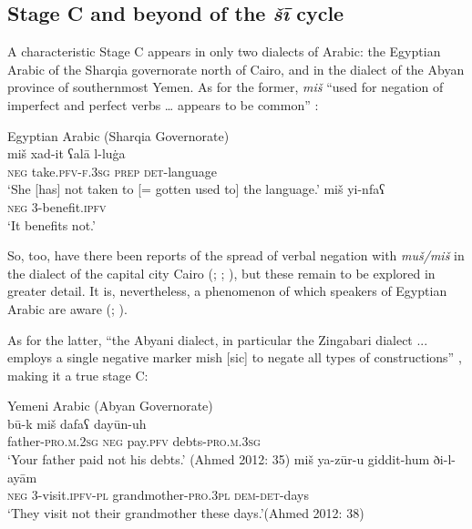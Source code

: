\documentclass[output=paper]{langsci/langscibook}
\begin{document}
\subsection{Stage C and beyond of the \textit{šī} cycle} \label{s:WiAR-3.5}

A characteristic Stage C appears in only two dialects of Arabic: the Egyptian Arabic of the Sharqia governorate north of Cairo, and in the dialect of the Abyan province of southernmost Yemen. As for the former, \textit{miš} “used for negation of imperfect and perfect verbs … appears to be common” \citep[v, 70-72, emphasis added]{h2011a}:

\ea Egyptian Arabic (Sharqia Governorate)\label{ex:WiAR-19}\\
  \ea
  	\gll miš xad-it ʕalā l-luġa\\
  	\textsc{neg} take.\textsc{pfv-f.3sg} \textsc{prep} \textsc{det}-language \\
  	\glt ‘She [has] not taken to [= gotten used to] the language.’ \citep[59]{h2011a}
  \ex
  	\gll miš yi-nfaʕ\\
  	\textsc{neg} 3-benefit.\textsc{ipfv}\\
  	\glt ‘It benefits not.’ \citep[72]{h2011a} 
\z \z

So, too, have there been reports of the spread of verbal negation with \textit{muš/miš} in the dialect of the capital city Cairo (\citealp[301–306]{brustad2000a}; \citealp{doss2008a}; \citealp[525]{wilmsen2020a}), but these remain to be explored in greater detail. It is, nevertheless, a phenomenon of which speakers of Egyptian Arabic are aware (\citealp[301]{brustad2000a}; \citealp[65-72]{h2011a}).

As for the latter, “the Abyani dialect, in particular the Zingabari dialect ... employs a single negative marker mish [sic] to negate all types of constructions”  \citep[33]{ahmed2012}, making it a true stage C:

\ea Yemeni Arabic (Abyan Governorate)\label{ex:WiAR-20}\\
  \ea
  	\gll bū-k miš dafaʕ dayūn-uh\\
  	father-\textsc{pro.m.2sg} \textsc{neg} pay.\textsc{pfv} debts-\textsc{pro.m.3sg} \\
  	\glt ‘Your father paid not his debts.’ (Ahmed 2012: 35)
  \ex
  	\gll miš ya-zūr-u giddit-hum ði-l-ayām\\
  	\textsc{neg} 3-visit.\textsc{ipfv-pl} grandmother-\textsc{pro.3pl} \textsc{dem-det}-days\\
  	\glt ‘They visit not their grandmother these days.’(Ahmed 2012: 38) 
\z \z
\end{document}
